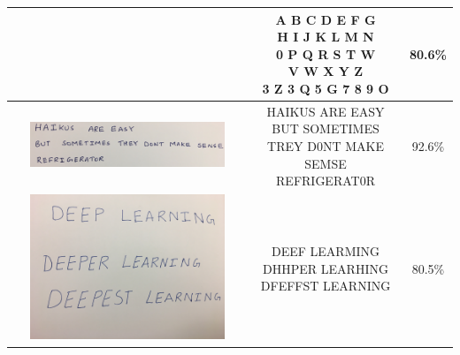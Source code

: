 \documentclass[11pt]{article}
\begin{document}
\begin{table}[h!]
\begin{tabular}{ | c | c |c | }
\begin{minipage}{.3\textwidth}
      \end{minipage}
      &
      \makecell{A B C D E F G\\H I J K L M N\\0 P Q R S T W\\V W X Y Z\\3 Z 3 Q 5 G 7 8 9 O} 
      & 
      80.6\% \\ \hline
      \begin{minipage}{.3\textwidth}
        \includegraphics[width=0.85\textwidth]{figures/03_haiku.jpg}
      \end{minipage}
      &
      \makecell{HAIKUS ARE EASY\\BUT SOMETIMES TREY D0NT MAKE SEMSE\\REFRIGERAT0R} 
      & 
      92.6\% \\ \hline
      \begin{minipage}{.3\textwidth}
        \includegraphics[width=0.85\textwidth]{figures/04_deep.jpg}
      \end{minipage}
      &
      \makecell{DEEF LEARMING\\DHHPER LEARHING\\DFEFFST LEARNING} 
      & 
      80.5\% \\ \hline      

    \end{tabular}       
  \end{table}

\clearpage
\end{document}
